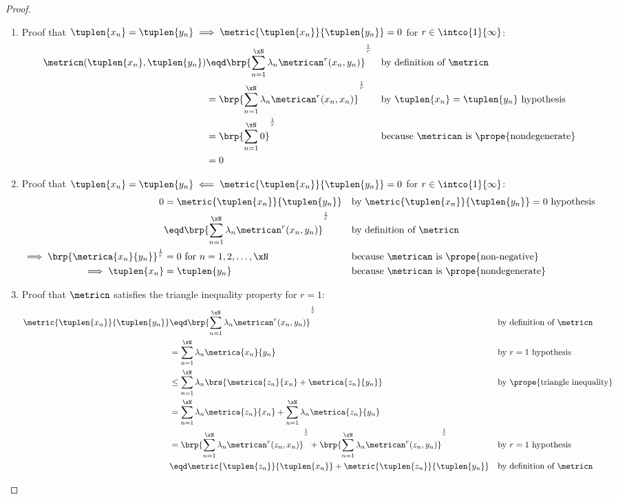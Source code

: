 \begin{proof}
\begin{enumerate}
  \item Proof that $\tuplen{x_n}=\tuplen{y_n}\implies\metric{\tuplen{x_n}}{\tuplen{y_n}}=0$ for $r\in\intco{1}{\infty}$:
    \begin{align*}
      \metricn(\tuplen{x_n},\tuplen{y_n})
        &\eqd \brp{\sum_{n=1}^\xN \lambda_n \metrican^r(x_n,y_n)}^\frac{1}{r}
        &&    \text{by definition of $\metricn$}
      \\&=    \brp{\sum_{n=1}^\xN \lambda_n \metrican^r(x_n,x_n)}^\frac{1}{r}
        &&    \text{by $\tuplen{x_n}=\tuplen{y_n}$ hypothesis}
      \\&=    \brp{\sum_{n=1}^\xN 0}^\frac{1}{r}
        &&    \text{because $\metrican$ is \prope{nondegenerate}}
      \\&=    0
    \end{align*}

  \item Proof that $\tuplen{x_n}=\tuplen{y_n}\impliedby\metric{\tuplen{x_n}}{\tuplen{y_n}}=0$ for $r\in\intco{1}{\infty}$:
     \begin{align*}
      0
        &=    \metric{\tuplen{x_n}}{\tuplen{y_n}}
        &&    \text{by $\metric{\tuplen{x_n}}{\tuplen{y_n}}=0$ hypothesis}
      \\&\eqd \brp{\sum_{n=1}^\xN \lambda_n \metrican^r(x_n,y_n)}^\frac{1}{r}
        &&    \text{by definition of $\metricn$}
      \\\implies \brp{\metrica{x_n}{y_n}}^\frac{1}{r} &= 0 \text{ for } n=1,2,\ldots,\xN
        &&    \text{because $\metrican$ is \prope{non-negative}}
      \\\implies \tuplen{x_n}&=\tuplen{y_n}
        &&    \text{because $\metrican$ is \prope{nondegenerate}}
    \end{align*}
  
  \item Proof that $\metricn$ satisfies the triangle inequality property  for $r=1$:
    \begin{align*}
      \metric{\tuplen{x_n}}{\tuplen{y_n}}
        &\eqd \brp{\sum_{n=1}^\xN \lambda_n \metrican^r(x_n,y_n)}^\frac{1}{r}
        &&    \text{by definition of $\metricn$}
      \\&=    \sum_{n=1}^\xN \lambda_n \metrica{x_n}{y_n}
        &&    \text{by $r=1$ hypothesis}
      \\&\leq \sum_{n=1}^\xN \lambda_n \brs{\metrica{z_n}{x_n}+\metrica{z_n}{y_n}}
        &&    \text{by \prope{triangle inequality}}
      \\&=    \sum_{n=1}^\xN \lambda_n \metrica{z_n}{x_n} + \sum_{n=1}^\xN \lambda_n \metrica{z_n}{y_n}
      \\&=    \brp{\sum_{n=1}^\xN \lambda_n \metrican^r(z_n,x_n)}^\frac{1}{r} + \brp{\sum_{n=1}^\xN \lambda_n \metrican^r(z_n,y_n)}^\frac{1}{r}
        &&    \text{by $r=1$ hypothesis}
      \\&\eqd \metric{\tuplen{z_n}}{\tuplen{x_n}} + \metric{\tuplen{z_n}}{\tuplen{y_n}}
        &&    \text{by definition of $\metricn$}
    \end{align*}


\end{enumerate}
\end{proof}

